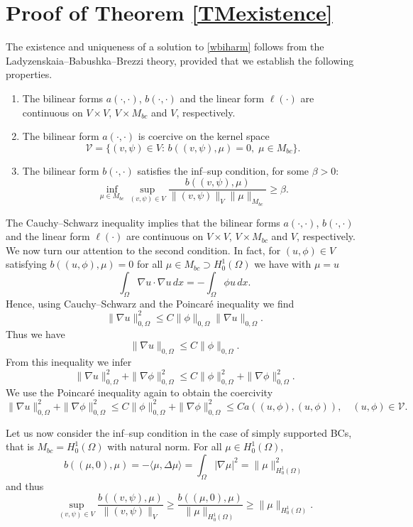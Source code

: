 \documentclass[a4paper,final]{siamltex}
\newcommand{\CV}{\mathcal{V}}
\newcommand{\M}{{M_{bc}}}
\begin{document}
\appendix

\section{Proof of Theorem \ref{TMexistence}}

The existence and uniqueness of a solution
to \eqref{wbiharm} follows from the Ladyzenskaia--Babushka--Brezzi theory, provided that
we establish the following properties.
\begin{enumerate}
\item The bilinear forms $a(\cdot,\cdot)$, $b(\cdot,\cdot)$ and the linear form 
$\ell(\cdot)$ are continuous on $V \times V$, $V \times \M$ and 
$V$, respectively. 
\item The bilinear form $a(\cdot,\cdot)$ is coercive on the kernel space 
\[ \CV =\{ (v, \psi) \in V :\, b((v,\psi),\mu) = 0,\; \mu\in \M\}.\]  
\item The bilinear form $b(\cdot,\cdot)$ satisfies the inf--sup condition, for some $\beta>0$:
\[ \inf_{\mu \in \M} \sup_{(v, \psi)  \in V} \frac{b((v,\psi),\mu)} 
{ \|(v,\psi)\|_{V} \|\mu\|_{\M}} \geq \beta. \]

\end{enumerate}
The Cauchy--Schwarz inequality implies that the bilinear forms $a(\cdot,\cdot)$, $b(\cdot,\cdot)$ and the linear form 
$\ell(\cdot)$ are continuous on $V \times V$, $V \times \M$ and 
$V$, respectively. 
 We now turn our attention to the second condition. 
In fact, for $(u, \phi) \in V $ satisfying $ b((u,\phi),\mu) = 0$ for all $\mu \in \M\supset H^1_0(\Omega)$ we have  with $\mu=u$ 
\[ \int_{\Omega} \nabla u \cdot \nabla u \,dx = - \int_{\Omega} \phi u\,dx.\]
Hence, using Cauchy--Schwarz and the Poincar\'e inequality we find 
\[ \|\nabla u \|^2_{0,\Omega} \leq C \|\phi\|_{0,\Omega} \|\nabla u\|_{0,\Omega}.\]
Thus we have 
\[ \|\nabla u \|_{0,\Omega}  \leq C \|\phi\|_{0,\Omega}.\]
From this inequality we  infer 
\[ \|\nabla u \|^2_{0,\Omega}+  \|\nabla \phi\|^2_{0,\Omega}
\leq C \|\phi\|^2_{0,\Omega} + \|\nabla \phi\|^2_{0,\Omega}.\]
We use the Poincar\'e inequality again to obtain the coercivity 
\[ \|\nabla u \|^2_{0,\Omega}+  \|\nabla \phi\|^2_{0,\Omega}\leq C
 \|\phi\|^2_{0,\Omega} + \|\nabla \phi\|^2_{0,\Omega}
\leq C a((u,\phi),(u,\phi)), \quad (u,\phi) \in \CV.\]

Let us now consider the inf--sup condition in the case of simply supported BCs, that
is $\M=H^1_0(\Omega)$ with natural norm.
For all $\mu\in H^1_0(\Omega)$,
\[
b((\mu,0),\mu)=-\langle \mu,\Delta\mu\rangle = \int_\Omega |\nabla\mu|^2=\|\mu\|_{H^1_0(\Omega)}^2
\]
and thus 
\[
\sup_{(v, \psi)  \in V} \frac{b((v,\psi),\mu)} 
{ \|(v,\psi)\|_{V} }\ge \frac{b((\mu,0),\mu)}{\|\mu\|_{H^1_0(\Omega)}}\ge \|\mu\|_{H^1_0(\Omega)}.
\]
\end{document}
